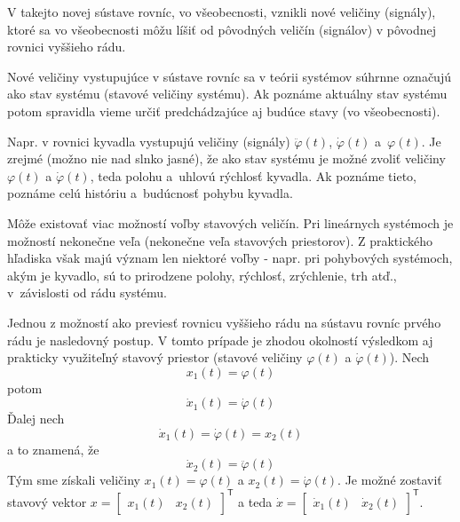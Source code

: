 \documentclass[a4paper, 10pt, ]{article}
\begin{document}
V takejto novej sústave rovníc, vo všeobecnosti, vznikli nové veličiny (signály), ktoré sa vo všeobecnosti môžu líšiť od pôvodných veličín (signálov) v pôvodnej rovnici vyššieho rádu.


Nové veličiny vystupujúce v sústave rovníc sa v teórii systémov súhrnne označujú ako stav systému (stavové veličiny systému). Ak poznáme aktuálny stav systému potom spravidla vieme určiť predchádzajúce aj budúce stavy (vo všeobecnosti).

Napr. v rovnici kyvadla vystupujú veličiny (signály) $\ddot \varphi(t)$, $\dot \varphi(t)$ a~$\varphi(t)$. Je zrejmé (možno nie nad slnko jasné), že ako stav systému je možné zvoliť veličiny $\varphi(t)$ a $\dot \varphi(t)$, teda polohu a~uhlovú rýchlosť kyvadla. Ak poznáme tieto, poznáme celú históriu a~budúcnosť pohybu kyvadla.

Môže existovať viac možností voľby stavových veličín. Pri lineárnych systémoch je možností nekonečne veľa (nekonečne veľa stavových priestorov). Z praktického hľadiska však majú význam len niektoré voľby - napr. pri pohybových systémoch, akým je kyvadlo, sú to prirodzene polohy, rýchlosť, zrýchlenie, trh atď., v~závislosti od rádu systému.



Jednou z možností ako previesť rovnicu vyššieho rádu na sústavu rovníc prvého rádu je nasledovný postup. V tomto prípade je zhodou okolností výsledkom aj prakticky využiteľný stavový priestor (stavové veličiny $\varphi(t)$ a $\dot \varphi(t)$). Nech
\begin{equation}
    x_1(t) = \varphi(t)
\end{equation}
potom
\begin{equation}
    \dot x_1(t) = \dot \varphi(t)
\end{equation}
Ďalej nech
\begin{equation}
    \dot x_1(t) = \dot \varphi(t) = x_2(t)
\end{equation}
a to znamená, že
\begin{equation}
    \dot x_2(t) = \ddot \varphi(t)
\end{equation}
Tým sme získali veličiny $x_1(t) = \varphi(t)$ a $x_2(t) = \dot \varphi(t)$. Je možné zostaviť stavový vektor $x = \begin{bmatrix} x_1(t) & x_2(t) \end{bmatrix}^\mathsf T$ a teda $\dot x = \begin{bmatrix} \dot x_1(t) & \dot x_2(t) \end{bmatrix}^\mathsf T$.
\end{document}
